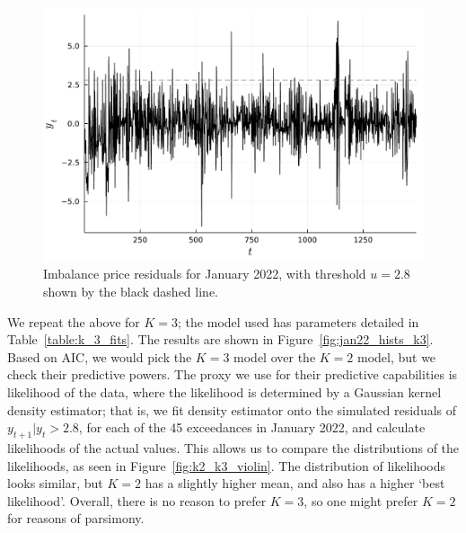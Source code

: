 \documentclass[11pt,twoside,openany]{book}
\numberwithin{Theorem}{chapter}
\numberwithin{Definition}{chapter}
\numberwithin{Lemma}{chapter}
\numberwithin{Algorithm}{chapter}
\numberwithin{equation}{chapter}
\begin{document}
\begin{figure}[htp]
  \centering
  \includegraphics[scale=0.70]{../elexon/figures/resids_jan_22.pdf}
  \caption{Imbalance price residuals for January 2022, with threshold $u=2.8$ shown by the black dashed line.}\label{fig:jan22_resids}
\end{figure}



We repeat the above for $K=3$; the model used has parameters detailed in
Table~\ref{table:k_3_fits}. The results are shown in
Figure~\ref{fig:jan22_hists_k3}. Based on AIC, we would pick the $K=3$ model over
the $K=2$ model, but we check their predictive powers. The proxy we use for
their predictive capabilities is likelihood of the data, where the likelihood
is determined by a Gaussian kernel density estimator; that is, we fit density
estimator onto the simulated residuals of $y_{t+1}|y_{t} > 2.8$, for each of
the 45 exceedances in January 2022, and calculate likelihoods of the actual
values. This allows us to compare the distributions of the likelihoods,
as seen in Figure~\ref{fig:k2_k3_violin}. The distribution of likelihoods
looks similar, but $K=2$ has a
slightly higher mean, and also has a higher `best likelihood'.
Overall, there is no reason to prefer $K=3$, so one might prefer $K=2$
for reasons of parsimony.
\end{document}
